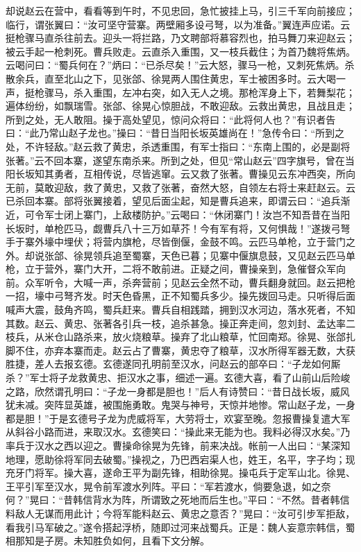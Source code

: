 却说赵云在营中，看看等到午时，不见忠回，急忙披挂上马，引三千军向前接应；临行，谓张翼曰：“汝可坚守营寨。两壁厢多设弓弩，以为准备。”翼连声应诺。云挺枪骤马直杀往前去。迎头一将拦路，乃文聘部将慕容烈也，拍马舞刀来迎赵云；被云手起一枪刺死。曹兵败走。云直杀入重围，又一枝兵截住；为首乃魏将焦炳。云喝问曰：“蜀兵何在？”炳曰：“已杀尽矣！”云大怒，骤马一枪，又刺死焦炳。杀散余兵，直至北山之下，见张郃、徐晃两人围住黄忠，军士被困多时。云大喝一声，挺枪骤马，杀入重围，左冲右突，如入无人之境。那枪浑身上下，若舞梨花；遍体纷纷，如飘瑞雪。张郃、徐晃心惊胆战，不敢迎敌。云救出黄忠，且战且走；所到之处，无人敢阻。操于高处望见，惊问众将曰：“此将何人也？”有识者告曰：“此乃常山赵子龙也。”操曰：“昔日当阳长坂英雄尚在！”急传令曰：“所到之处，不许轻敌。”赵云救了黄忠，杀透重围，有军士指曰：“东南上围的，必是副将张著。”云不回本寨，遂望东南杀来。所到之处，但见“常山赵云”四字旗号，曾在当阳长坂知其勇者，互相传说，尽皆逃窜。云又救了张著。曹操见云东冲西突，所向无前，莫敢迎敌，救了黄忠，又救了张著，奋然大怒，自领左右将士来赶赵云。云已杀回本寨。部将张翼接着，望见后面尘起，知是曹兵追来，即谓云曰：“追兵渐近，可令军士闭上寨门，上敌楼防护。”云喝曰：“休闭寨门！汝岂不知吾昔在当阳长坂时，单枪匹马，觑曹兵八十三万如草芥！今有军有将，又何惧哉！”遂拨弓弩手于寨外壕中埋伏；将营内旗枪，尽皆倒偃，金鼓不鸣。云匹马单枪，立于营门之外。却说张郃、徐晃领兵追至蜀寨，天色已暮；见寨中偃旗息鼓，又见赵云匹马单枪，立于营外，寨门大开，二将不敢前进。正疑之间，曹操亲到，急催督众军向前。众军听令，大喊一声，杀奔营前；见赵云全然不动，曹兵翻身就回。赵云把枪一招，壕中弓弩齐发。时天色昏黑，正不知蜀兵多少。操先拨回马走。只听得后面喊声大震，鼓角齐鸣，蜀兵赶来。曹兵自相践踏，拥到汉水河边，落水死者，不知其数。赵云、黄忠、张著各引兵一枝，追杀甚急。操正奔走间，忽刘封、孟达率二枝兵，从米仓山路杀来，放火烧粮草。操弃了北山粮草，忙回南郑。徐晃、张郃扎脚不住，亦弃本寨而走。赵云占了曹寨，黄忠夺了粮草，汉水所得军器无数，大获胜捷，差人去报玄德。玄德遂同孔明前至汉水，问赵云的部卒曰：“子龙如何厮杀？”军士将子龙救黄忠、拒汉水之事，细述一遍。玄德大喜，看了山前山后险峻之路，欣然谓孔明曰：“子龙一身都是胆也！”后人有诗赞曰：“昔日战长坂，威风犹未减。突阵显英雄，被围施勇敢。鬼哭与神号，天惊并地惨。常山赵子龙，一身都是胆！”于是玄德号子龙为虎威将军，大劳将士，欢宴至晚。忽报曹操复遣大军从斜谷小路而进，来取汉水。玄德笑曰：“操此来无能为也。我料必得汉水矣。”乃率兵于汉水之西以迎之。曹操命徐晃为先锋，前来决战。帐前一人出曰：“某深知地理，愿助徐将军同去破蜀。”操视之，乃巴西宕渠人也，姓王，名平，字子均；现充牙门将军。操大喜，遂命王平为副先锋，相助徐晃。操屯兵于定军山北。徐晃、王平引军至汉水，晃令前军渡水列阵。平曰：“军若渡水，倘要急退，如之奈何？”晃曰：“昔韩信背水为阵，所谓致之死地而后生也。”平曰：“不然。昔者韩信料敌人无谋而用此计；今将军能料赵云、黄忠之意否？”晃曰：“汝可引步军拒敌，看我引马军破之。”遂令搭起浮桥，随即过河来战蜀兵。正是：魏人妄意宗韩信，蜀相那知是子房。未知胜负如何，且看下文分解。